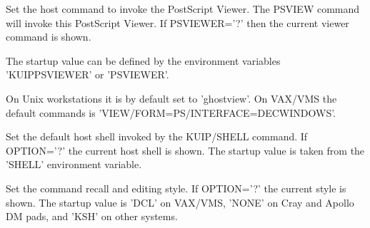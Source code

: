 \ENDCMD


\BEGARG
{}
\ENDARG

   \par
Set the host command to invoke the PostScript Viewer.  The PSVIEW command 
   will invoke this PostScript Viewer.  If PSVIEWER='?' then the current 
   viewer command is shown.  

   \par
The startup value can be defined by the environment variables 
   'KUIPPSVIEWER' or 'PSVIEWER'.  

   \par
On Unix workstations it is by default set to 'ghostview'.  On VAX/VMS the 
   default commands is 'VIEW/FORM=PS/INTERFACE=DECWINDOWS'.  

\ENDCMD


\BEGARG
{}
\ENDARG

   \par
Set the default host shell invoked by the KUIP/SHELL command.  If 
   OPTION='?' the current host shell is shown.  The startup value is taken 
   from the 'SHELL' environment variable.  

\ENDCMD


\BEGARG
{}
\ENDARG
{}
\ENDOPT

   \par
Set the command recall and editing style.  If OPTION='?' the current style 
   is shown.  The startup value is 'DCL' on VAX/VMS, 'NONE' on Cray and Apollo 
   DM pads, and 'KSH' on other systems.  

